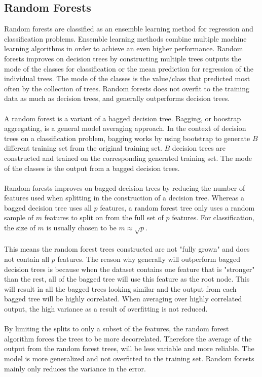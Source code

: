 \documentclass[a4paper,twocolumn]{article}
\begin{document}
\subsection{Random Forests}
Random forests are classified as an ensemble learning method for regression and classification problems. Ensemble learning methods combine multiple machine learning algorithms in order to achieve an even higher performance. Random forests improves on decision trees by constructing multiple trees outputs the mode of the classes for classification or the mean prediction for regression of the individual trees. The mode of the classes is the value/class that predicted most often by the collection of trees. Random forests does not overfit to the training data as much as decision trees, and generally outperforms decision trees.\\
\\
A random forest is a variant of a bagged decision tree. Bagging, or boostrap aggregating, is a general model averaging approach. In the context of decision trees on a classification problem, bagging works by using bootstrap to generate $B$ different training set from the original training set. $B$ decision trees are constructed and trained on the corresponding generated training set. The mode of the classes is the output from a bagged decision trees.\\
\\
Random forests improves on bagged decision trees by reducing the number of features used when splitting in the construction of a decision tree. Whereas a bagged decision tree uses all $p$ features, a random forest tree only uses a random sample of $m$ features to split on from the full set of $p$ features. For classification, the size of $m$ is usually chosen to be $m \approx \sqrt{p}$.\\
\\
This means the random forest trees constructed are not "fully grown" and does not contain all $p$ features. The reason why generally will outperform bagged decision trees is because when the dataset contains one feature that is "stronger" than the rest, all of the bagged tree will use this feature as the root node. This will result in all the bagged trees looking similar and the output from each bagged tree will be highly correlated. When averaging over highly correlated output, the high variance as a result of overfitting is not reduced.\\
\\
By limiting the splits to only a subset of the features, the random forest algorithm forces the trees to be more decorrelated. Therefore the average of the output from the random forest trees, will be less variable and more reliable. The model is more generalized and not overfitted to the training set. Random forests mainly only reduces the variance in the error.
\end{document}

